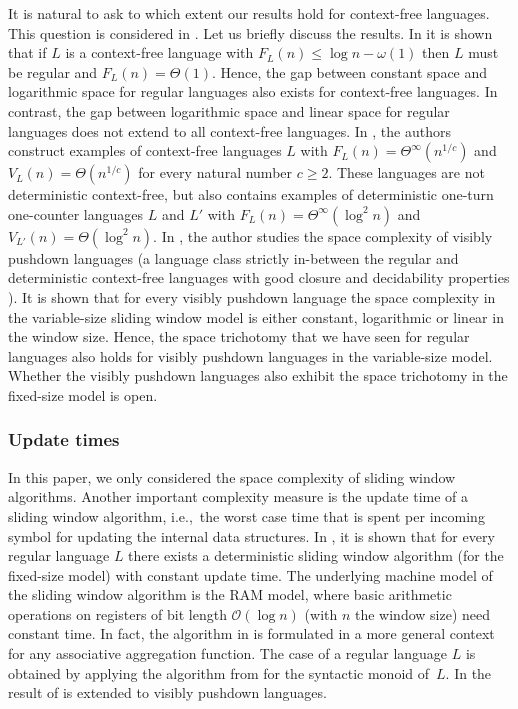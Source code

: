 \documentclass{article}\usepackage[a4paper,margin=20mm]{geometry}
\renewcommand{\O}{\mathcal{O}}
\renewcommand{\geq}{\geqslant}
\renewcommand{\leq}{\leqslant}
\newcommand{\Thetainf}{\Theta^{\scriptscriptstyle{\infty}}}
\begin{document}
It is natural to ask to which extent our results hold for context-free languages. This 
question is considered in \cite{GanardiJL18,Ganardi19}. Let us briefly discuss the results.
In \cite{GanardiJL18} it is shown that if $L$ is a context-free language with $F_L(n) \leq \log n - \omega(1)$
then $L$ must be regular and $F_L(n) = \Theta(1)$. Hence, the gap between constant space and logarithmic
space for regular languages also exists for context-free languages. In contrast, the gap between logarithmic
space and linear space for regular languages does not extend to all context-free languages. In  \cite{GanardiJL18},
the authors construct examples of context-free languages $L$ with $F_L(n) = \Thetainf(n^{1/c})$ and $V_L(n) = \Theta(n^{1/c})$ for every natural
number $c \geq 2$. These languages are not deterministic context-free, but \cite{GanardiJL18} also contains
examples of deterministic one-turn one-counter languages $L$ and $L'$ with $F_L(n) = \Thetainf(\log^2 n)$
and $V_{L'}(n) = \Theta(\log^2 n)$. In \cite{Ganardi19}, the author studies  the space complexity of visibly pushdown languages (a 
language class strictly in-between the regular and deterministic 
context-free languages with good closure and decidability properties \cite{AlurM04}). 
It is shown that for every visibly pushdown language the space complexity in the variable-size sliding window model is either constant, logarithmic or linear in the window size. 
Hence, the space trichotomy that we have seen for regular languages also holds for visibly pushdown languages in the variable-size model.
Whether the visibly pushdown languages also exhibit the space trichotomy in the fixed-size model is open.


\subsubsection{Update times}

In this paper, we only considered the space complexity of sliding window algorithms.
Another important complexity measure is the update time of a sliding window algorithm, i.e.,~the 
worst case time that is spent per incoming symbol for updating the internal data structures.
In \cite{TangwongsanH017}, it is shown that for every regular language $L$ there exists
a deterministic sliding window algorithm (for the fixed-size model) with constant update time.
The underlying machine model of the sliding window algorithm is the RAM model, where basic arithmetic operations on registers
of bit length $ \O(\log n)$ (with $n$ the window size) need constant time. In fact,
the algorithm in \cite{TangwongsanH017} is formulated in a more general context for any associative
aggregation function. The case of a regular language $L$ is obtained by applying the algorithm
from \cite{TangwongsanH017} for the syntactic monoid of~$L$. In \cite{GanardiJLS22} the result of \cite{TangwongsanH017}
is extended to visibly pushdown languages. 
\end{document}
